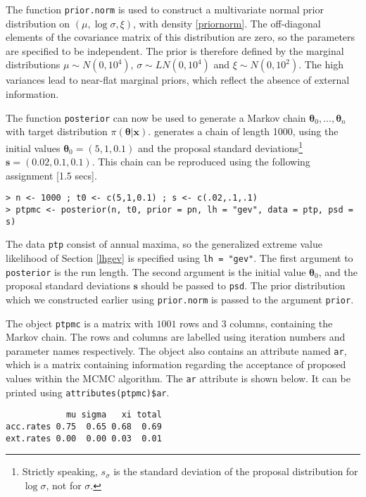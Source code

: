 \documentclass[11pt,a4paper]{article}
\newcommand{\bs}{\boldsymbol}
\begin{document}
The function \verb+prior.norm+ is used to construct a multivariate normal prior distribution on $(\mu, \log \sigma, \xi)$, with density \eqref{priornorm}.
The off-diagonal elements of the covariance matrix of this distribution are zero, so the parameters are specified to be independent.
The prior is therefore defined by the marginal distributions $\mu \sim N(0,10^4)$, $\sigma \sim LN(0,10^4)$ and $\xi \sim N(0,10^2)$.
The high variances lead to near-flat marginal priors, which reflect the absence of external information.

The function \verb+posterior+ can now be used to generate a Markov chain $\bs{\theta}_0,\dots,\bs{\theta}_n$ with target distribution $\pi(\bs{\theta}|\bs{x})$.
\citet{cole01} generates a chain of length 1000, using the initial values $\bs{\theta}_0 = (5,1,0.1)$ and the proposal standard deviations\footnote{Strictly speaking, $s_\sigma$ is the standard deviation of the proposal distribution for $\log \sigma$, not for $\sigma$.} $\bs{s} = (0.02,0.1,0.1)$.
This chain can be reproduced using the following assignment [1.5 secs].

\begin{verbatim}
> n <- 1000 ; t0 <- c(5,1,0.1) ; s <- c(.02,.1,.1)
> ptpmc <- posterior(n, t0, prior = pn, lh = "gev", data = ptp, psd = s)
\end{verbatim}

The data \verb+ptp+ consist of annual maxima, so the generalized extreme value likelihood of Section \ref{lhgev} is specified using \verb+lh = "gev"+.
The first argument to \verb+posterior+ is the run length.
The second argument is the initial value $\bs{\theta}_0$, and the proposal standard deviations  $\bs{s}$ should be passed to \verb+psd+.
The prior distribution which we constructed earlier using \verb+prior.norm+ is passed to the argument \verb+prior+.

The object \verb+ptpmc+ is a matrix with $1001$ rows and $3$ columns, containing the Markov chain.
The rows and columns are labelled using iteration numbers and parameter names respectively.
The object also contains an attribute named \verb+ar+, which is a matrix containing information regarding the acceptance of proposed values within the MCMC algorithm.
The \verb+ar+ attribute is shown below.
It can be printed using \verb+attributes(ptpmc)$ar+. 

\begin{verbatim}
            mu sigma   xi total
acc.rates 0.75  0.65 0.68  0.69
ext.rates 0.00  0.00 0.03  0.01
\end{verbatim}
\end{document}
